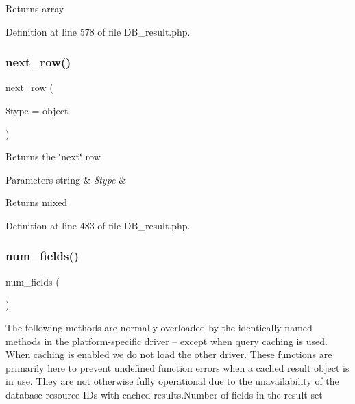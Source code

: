 \begin{DoxyReturn}{Returns}
array 
\end{DoxyReturn}


Definition at line 578 of file D\+B\+\_\+result.\+php.

\mbox{\label{class_c_i___d_b__result_a5664a519252b14c1cdd93d9de0322a9f}} 
\subsubsection{\texorpdfstring{next\_row()}{next\_row()}}
{\footnotesize\ttfamily next\+\_\+row (\begin{DoxyParamCaption}\item[{}]{\$type = {\ttfamily \textquotesingle{}object\textquotesingle{}} }\end{DoxyParamCaption})}

Returns the \char`\"{}next\char`\"{} row


\begin{DoxyParams}[1]{Parameters}
string & {\em \$type} & \\
\hline
\end{DoxyParams}
\begin{DoxyReturn}{Returns}
mixed 
\end{DoxyReturn}


Definition at line 483 of file D\+B\+\_\+result.\+php.

\mbox{\label{class_c_i___d_b__result_af831bf363e4d7d661a717a4932af449d}} 
\subsubsection{\texorpdfstring{num\_fields()}{num\_fields()}}
{\footnotesize\ttfamily num\+\_\+fields (\begin{DoxyParamCaption}{ }\end{DoxyParamCaption})}

The following methods are normally overloaded by the identically named methods in the platform-\/specific driver -- except when query caching is used. When caching is enabled we do not load the other driver. These functions are primarily here to prevent undefined function errors when a cached result object is in use. They are not otherwise fully operational due to the unavailability of the database resource I\+Ds with cached results.\+Number of fields in the result set

